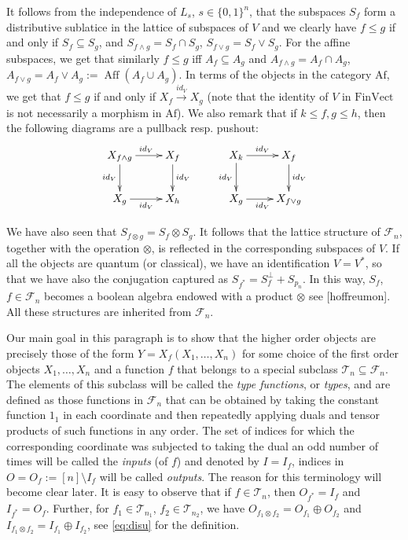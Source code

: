 \documentclass[12pt]{article}
\theoremstyle{definition}
\theoremstyle{remark}
\def\aff{\operatorname{Aff}}
\def\Te{\mathcal T}
\def\Fe{\mathcal F}
\def \Af{\mathrm{Af}}
\def \FV{\mathrm{FinVect}}
\begin{document}
It follows from the independence of $L_s$, $s\in \{0,1\}^n$, that  the subspaces $S_f$ form a
distributive sublatice in the lattice of subspaces of $V$ and we clearly have 
$f\le g$ if and only if $S_f\subseteq S_g$, and $S_{f\wedge g}=S_f\cap S_g$, $S_{f\vee
g}=S_f\vee S_g$. For the affine subspaces, we get that similarly $f\le g$ iff
$A_f\subseteq A_g$ and  $A_{f\wedge g}=A_f\cap A_g$, $A_{f\vee g}=A_f\vee
A_g:=\aff(A_f\cup A_g)$. 
In terms of the objects in the category $\Af$, we get that $f\le g$ if and only if $X_f\xrightarrow{id_V} X_g$
(note that the identity of $V$ in $\FV$ is not necessarily a morphism in $\Af$). We also
remark that if $k\le f,g\le h$, then the following diagrams are  a pullback resp.  pushout:
\[
\xymatrix{
X_{f\wedge g}\ar[r]^{id_V}
\ar[d]_{id_V} & X_f\ar[d]^{id_V} \\
X_g \ar[r]_{id_V}& X_h
} \qquad 
\xymatrix{
X_{k}\ar[r]^{id_V}
\ar[d]_{id_V} & X_f\ar[d]^{id_V} \\
X_g \ar[r]_{id_V}& X_{f\vee g}
}
\]

We have also seen that $S_{f\otimes g}=S_f\otimes S_g$. It follows that the lattice structure of
$\Fe_n$, together with the operation $\otimes$, is reflected in the corresponding
subspaces of $V$. If all the objects are quantum (or classical), we have an identification
$V=V^*$, so that we have also the conjugation captured as $S_{f^*}=S_f^\perp + S_{p_n}$. 
In this way, $S_f$, $f\in \Fe_n$ becomes a boolean algebra endowed with a product
$\otimes$ {\color{red} see [hoffreumon]}. All these structures are inherited from $\Fe_n$.



Our main goal in this paragraph  is to show that the higher order objects are precisely those of the form
$Y=X_f(X_1,\dots,X_n)$ for some choice of the
first order objects $X_1,\dots, X_n$ and a function $f$ that belongs to a special subclass
 $\Te_n\subseteq \Fe_n$. The elements of this subclass will be called the {\em type
 functions},
 or {\em types}, and are defined as those functions in $\Fe_n$ that can be obtained by taking
 the constant function $1_1$ in each coordinate and then repeatedly applying duals and tensor
 products of such functions in any order. The set of indices for which the corresponding
 coordinate  was subjected to taking the dual an odd  number of times will be called the
{\em inputs} (of $f$) and denoted by $I=I_f$, indices  in $O=O_f:=[n]\setminus I_f$ will be
called {\em outputs}. The reason for this terminology will become clear later. It is easy to observe that if $f\in \Te_n$, then $O_{f^*}=I_f$ and $I_{f^*}=O_f$. Further,
for $f_1\in \Te_{n_1}$, $f_2\in \Te_{n_2}$, we have $O_{f_1\otimes f_2}=O_{f_1}\oplus
O_{f_2}$ and  $I_{f_1\otimes f_2}=I_{f_1}\oplus
I_{f_2}$, see \eqref{eq:disu} for the definition.
\end{document}
